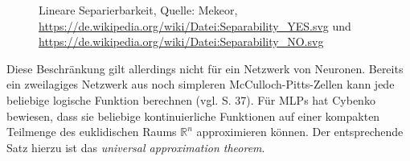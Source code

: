 \documentclass[
	twoside,
	12pt,
	a4paper,
	BCOR10mm,
	DIV14,
	listof=totoc,
	bibliography=totoc,
	headsepline
]{scrreprt}
\begin{document}
\begin{figure}
	\centering
	\hfill
	\caption{Lineare Separierbarkeit, Quelle: Mekeor, \url{https://de.wikipedia.org/wiki/Datei:Separability_YES.svg} und \url{https://de.wikipedia.org/wiki/Datei:Separability_NO.svg}}
	\label{fig:separierbarkeit}
\end{figure} 

Diese Beschränkung gilt allerdings nicht für ein Netzwerk von Neuronen. Bereits ein zweilagiges Netzwerk aus noch simpleren McCulloch-Pitts-Zellen kann jede beliebige logische Funktion berechnen (vgl. \cite{Rojas:1996:NNS:235222} S. 37).
Für MLPs hat Cybenko \cite{cybenko:mcss} bewiesen, dass sie beliebige kontinuierliche Funktionen auf einer kompakten Teilmenge des euklidischen Raums $\mathbb{R}^n$ approximieren können. Der entsprechende Satz hierzu ist das \textit{universal approximation theorem}.

\bigskip
\end{document}
